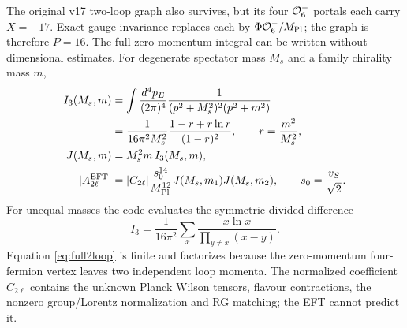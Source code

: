 \documentclass[11pt,a4paper]{article}
\begin{document}
The original v17 two-loop graph also survives, but its four
${\cal O}_6^-$ portals each carry $X=-17$. Exact gauge invariance replaces
each by $\Phi{\cal O}_6^-/M_{\rm Pl}$; the graph is therefore $P=16$.
The full zero-momentum integral can be written without dimensional
estimates. For degenerate spectator mass $M_s$ and a family chirality
mass $m$,
\begin{align}
 I_3(M_s,m)&=\int\frac{d^4p_E}{(2\pi)^4}
 \frac{1}{(p^2+M_s^2)^2(p^2+m^2)}\nonumber\\
 &=\frac{1}{16\pi^2M_s^2}
 \frac{1-r+r\ln r}{(1-r)^2},\qquad r=\frac{m^2}{M_s^2},
 \label{eq:triangle}\\
 J(M_s,m)&=M_s^2m\,I_3(M_s,m),\nonumber\\
 |A_{2\ell}^{\rm EFT}|&=|C_{2\ell}|\frac{s_0^{14}}{M_{\rm Pl}^{12}}
 J(M_s,m_1)J(M_s,m_2),\qquad s_0=\frac{v_S}{\sqrt2}.
\label{eq:full2loop}
\end{align}
For unequal masses the code evaluates the symmetric divided difference
\begin{equation}
 I_3=\frac{1}{16\pi^2}\sum_x
 \frac{x\ln x}{\prod_{y\ne x}(x-y)}.
\end{equation}
Equation
\eqref{eq:full2loop} is finite and factorizes because the zero-momentum
four-fermion vertex leaves two independent loop momenta. The normalized
coefficient $C_{2\ell}$ contains the unknown Planck Wilson tensors,
flavour contractions, the nonzero group/Lorentz normalization and RG
matching; the EFT cannot predict it.
\end{document}
